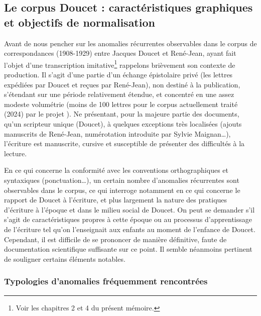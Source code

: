 \subsection{Le corpus Doucet : caractéristiques graphiques et objectifs de normalisation}

Avant de nous pencher sur les anomalies récurrentes observables dans le corpus de correspondances (1908-1929) entre Jacques Doucet et René-Jean, ayant fait l’objet d’une transcription imitative\footnote{Voir les chapitres 2 et 4 du présent mémoire.} rappelons brièvement son contexte de production. Il s’agit d’une partie d’un échange épistolaire privé (les lettres expédiées par Doucet et reçues par René-Jean), non destiné à la publication, s’étendant sur une période relativement étendue, et concentré en une assez modeste volumétrie (moins de 100 lettres pour le corpus actuellement traité (2024) par le projet \pense). Ne présentant, pour la majeure partie des documents, qu’un scripteur unique (Doucet), à quelques exceptions très localisées (ajouts manuscrits de René-Jean, numérotation introduite par Sylvie Maignan…), l’écriture est manuscrite, cursive et susceptible de présenter des difficultés à la lecture.

En ce qui concerne la conformité avec les conventions orthographiques et syntaxiques (ponctuation…), un certain nombre d’anomalies récurrentes sont observables dans le corpus, ce qui interroge notamment en ce qui concerne le rapport de Doucet à l’écriture, et plus largement la nature des pratiques d’écriture à l’époque et dans le milieu social de Doucet. On peut se demander s'il s'agit de caractéristiques propres à cette époque ou au processus d'apprentissage de l’écriture tel qu’on l'enseignait aux enfants au moment de l'enfance de Doucet. Cependant, il est difficile de se prononcer de manière définitive, faute de documentation scientifique suffisante sur ce point. Il semble néanmoins pertinent de souligner certains éléments notables.

\subsubsection{Typologies d’anomalies fréquemment rencontrées}

